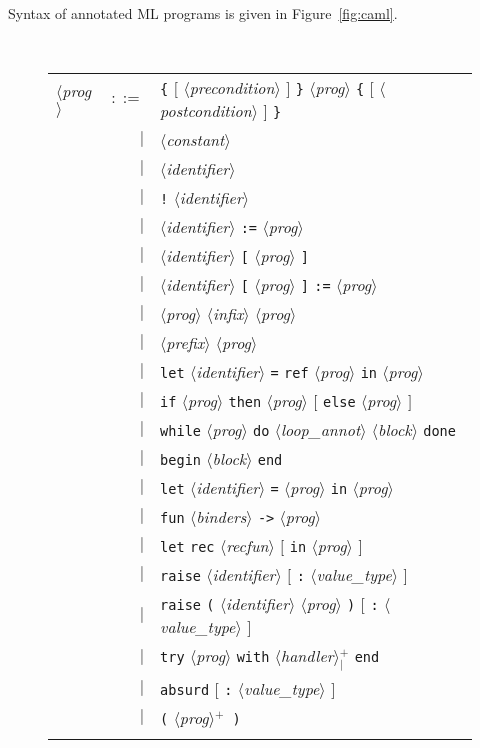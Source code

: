 \documentclass[a4paper,12pt]{report}
\makeatletter
\newcommand{\te}[1]{\texttt{#1}}
\newcommand{\nt}[1]{$\langle$\textsl{#1}$\rangle$}
\newcommand{\indexnt}[1]{\index{#1@\textsl{#1}, grammar entry}}
\newcommand{\indextt}[1]{\index{#1@\texttt{#1}}}
\newcommand{\plus}{$^+$}
\newcommand{\plussep}[1]{$^+_#1$}
\makeatother
\begin{document}
Syntax of annotated ML programs is given in Figure~\ref{fig:caml}.
\begin{figure}[htbp]
\begin{center}
\hrulefill\\
\begin{tabular}{lrl}
  \nt{prog}\indexnt{prog}
    & $::=$ & \te{\{} $[$ \nt{precondition} $]$ \te{\}}
              \nt{prog} 
              \te{\{} $[$ \nt{postcondition} $]$ \te{\}} \\
      & $|$ & \nt{constant} \\
      & $|$ & \nt{identifier} \\
      & $|$ & \te{!} \nt{identifier} \\
      & $|$ & \nt{identifier} \te{:=} \nt{prog} \\
      & $|$ & \nt{identifier} \te{[} \nt{prog} \te{]} \\
      & $|$ & \nt{identifier} \te{[} \nt{prog} \te{]} \te{:=} \nt{prog} \\
      & $|$ & \nt{prog} \nt{infix} \nt{prog} \\
      & $|$ & \nt{prefix} \nt{prog} \\
      & $|$ & \te{let} \nt{identifier} \te{=} \te{ref} 
              \nt{prog} \te{in} \nt{prog} \\
      & $|$ & \te{if} \nt{prog} \te{then} \nt{prog}
              $[$ \te{else} \nt{prog} $]$ \\
      & $|$ & \te{while} \nt{prog} \te{do}
              \nt{loop\_annot} \nt{block} \te{done} \\
      & $|$ & \te{begin} \nt{block} \te{end} \\
      & $|$ & \te{let} \nt{identifier} \te{=} \nt{prog} 
              \te{in} \nt{prog} \\
      & $|$ & \te{fun} \nt{binders} \te{->} \nt{prog} \\
      & $|$ & \te{let} \te{rec} \nt{recfun} $[$ \te{in} \nt{prog} $]$ \\
      & $|$ & \te{raise} \nt{identifier} $[$ \te{:} \nt{value\_type} $]$ \\
      & $|$ & \te{raise} \te{(} \nt{identifier} \nt{prog} \te{)}
              $[$ \te{:} \nt{value\_type} $]$ \\
      & $|$ & \te{try} \nt{prog} \te{with} 
              \nt{handler}\plussep{\te{|}} \te{end} \\
      & $|$ & \te{absurd} $[$ \te{:} \nt{value\_type} $]$ \\ \indextt{absurd}
      & $|$ & \te{(} \nt{prog}\plus\  \te{)} \\
  \\[0.1em]


\end{tabular}
\end{center}
\end{figure}
\end{document}
